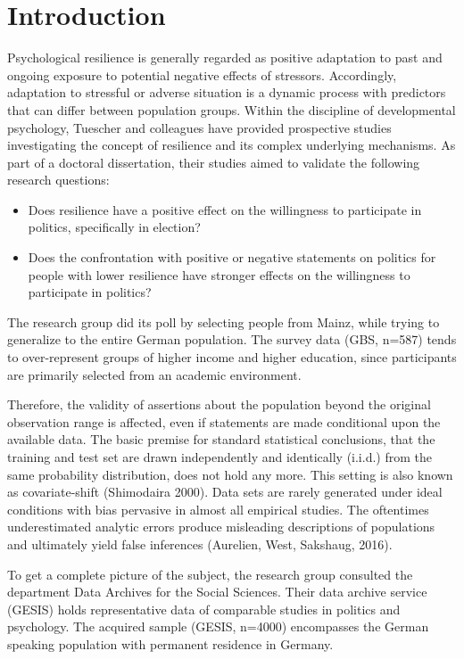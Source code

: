 \chapter{Introduction}

Psychological resilience is generally regarded as positive adaptation to past and ongoing exposure to potential negative effects of stressors. Accordingly, adaptation to stressful or adverse situation is a dynamic process with predictors that can differ between population groups. Within the discipline of developmental psychology, Tuescher and colleagues have provided prospective studies investigating the concept of resilience and its complex underlying mechanisms. As part of a doctoral dissertation, their studies aimed to validate the following research questions:

\begin{itemize}
    \item Does resilience have a positive effect on the willingness to participate in politics, specifically in election?
    \item Does the confrontation with positive or negative statements on politics for people with lower resilience have stronger effects on the willingness to participate in politics?
\end{itemize}

The research group did its poll by selecting people from Mainz, while trying to generalize to the entire German population. The survey data (GBS, n=587) tends to over-represent groups of higher income and higher education, since participants are primarily selected from an academic environment.

Therefore, the validity of assertions about the population beyond the original observation range is affected, even if statements are made conditional upon the available data. The basic premise for standard statistical conclusions, that the training and test set are drawn independently and identically (i.i.d.) from the same probability distribution, does not hold any more. This setting is also known as covariate-shift (Shimodaira 2000). Data sets are rarely generated under ideal conditions with bias pervasive in almost all empirical studies. The oftentimes underestimated analytic errors produce misleading descriptions of populations and ultimately yield false inferences (Aurelien, West, Sakshaug, 2016).

To get a complete picture of the subject, the research group consulted the department Data Archives for the Social Sciences. Their data archive service (GESIS) holds representative data of comparable studies in politics and psychology. The acquired sample (GESIS, n=4000) encompasses the German speaking population with permanent residence in Germany. 

